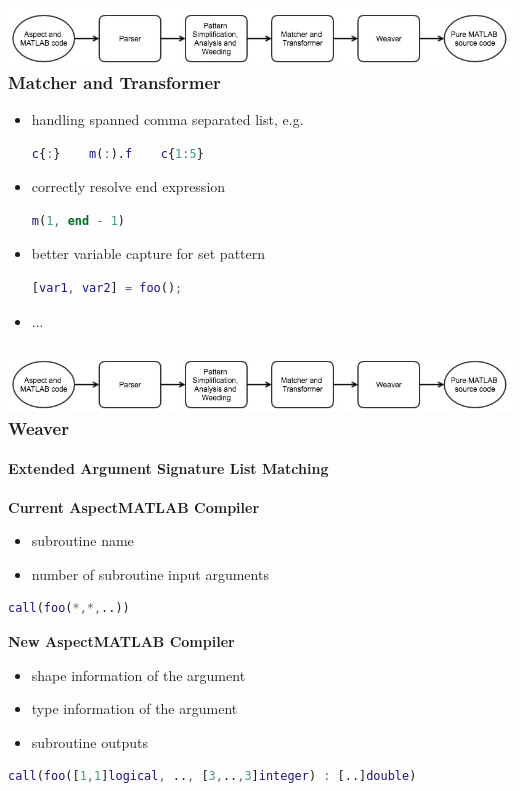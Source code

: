 \documentclass[10pt]{beamer}
\begin{document}
\begin{frame}[fragile]
\frametitle{\includegraphics[scale=0.4]{new_structure}\\Matcher and
            Transformer}
\begin{itemize}
\item handling spanned comma separated list, e.g.
\begin{lstlisting}[basicstyle=\small, language=MATLAB]
c{:}    m(:).f    c{1:5}    
\end{lstlisting}
\item correctly resolve end expression
\begin{lstlisting}[basicstyle=\small, language=MATLAB]
m(1, end - 1)
\end{lstlisting}
\item better variable capture for set pattern
\begin{lstlisting}[basicstyle=\small, language=MATLAB]
[var1, var2] = foo();    
\end{lstlisting}
\item ...
\end{itemize}   
\end{frame}

\begin{frame}[fragile]
\frametitle{\includegraphics[scale=0.4]{new_structure}\\Weaver}
\framesubtitle{Extended Argument Signature List Matching}
\textbf{Current AspectMATLAB Compiler}
\begin{itemize}
    \item subroutine name
    \item number of subroutine input arguments
\end{itemize}
\begin{lstlisting}[basicstyle=\small, language=MATLAB]
call(foo(*,*,..))    
\end{lstlisting}

\textbf{New AspectMATLAB Compiler}
\begin{itemize}
    \item shape information of the argument
    \item type information of the argument
    \item subroutine outputs
\end{itemize}
\begin{lstlisting}[basicstyle=\small, language=MATLAB]
call(foo([1,1]logical, .., [3,..,3]integer) : [..]double)    
\end{lstlisting}
\end{frame}
\end{document}
